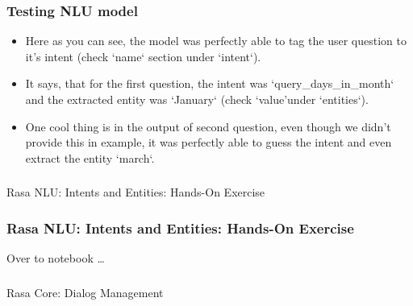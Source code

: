  \begin{frame}[fragile]\frametitle{Testing NLU model}

\begin{itemize}
\item Here as you can see, the model was perfectly able to tag the user question to it's intent (check `name` section under `intent`). 
\item It says, that for the first question, the intent was `query\_days\_in\_month` and the extracted entity was `January` (check `value'under `entities`). 
\item One cool thing is in the output of second question, even though we didn't provide this in example, it was perfectly able to guess the intent and even extract the entity `march`.
\end{itemize}
\end{frame}


\begin{frame}[fragile]\frametitle{}
\begin{center}

{\Large Rasa NLU: Intents and Entities: Hands-On Exercise}

\end{center}
\end{frame}

\begin{frame}[fragile]\frametitle{Rasa NLU: Intents and Entities: Hands-On Exercise}
\begin{center}

{\Large Over to notebook \ldots}

\end{center}
\end{frame}

\begin{frame}[fragile]\frametitle{}
\begin{center}
{\Large Rasa Core: Dialog Management}
\end{center}
\end{frame}


